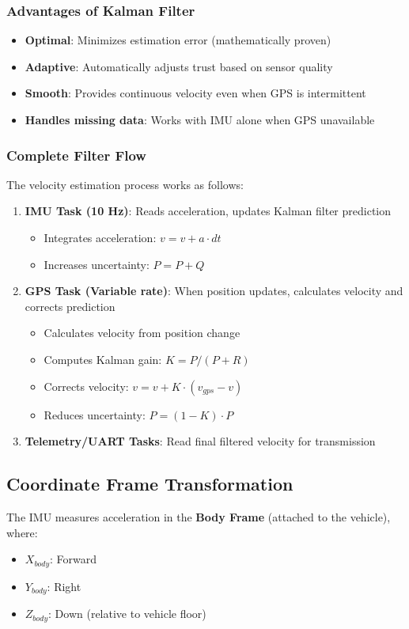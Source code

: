 \documentclass[11pt,a4paper]{article}
\begin{document}
\subsubsection{Advantages of Kalman Filter}
\begin{itemize}
    \item \textbf{Optimal}: Minimizes estimation error (mathematically proven)
    \item \textbf{Adaptive}: Automatically adjusts trust based on sensor quality
    \item \textbf{Smooth}: Provides continuous velocity even when GPS is intermittent
    \item \textbf{Handles missing data}: Works with IMU alone when GPS unavailable
\end{itemize}

\subsubsection{Complete Filter Flow}
The velocity estimation process works as follows:

\begin{enumerate}
    \item \textbf{IMU Task (10 Hz)}: Reads acceleration, updates Kalman filter prediction
    \begin{itemize}
        \item Integrates acceleration: $v = v + a \cdot dt$
        \item Increases uncertainty: $P = P + Q$
    \end{itemize}
    \item \textbf{GPS Task (Variable rate)}: When position updates, calculates velocity and corrects prediction
    \begin{itemize}
        \item Calculates velocity from position change
        \item Computes Kalman gain: $K = P / (P + R)$
        \item Corrects velocity: $v = v + K \cdot (v_{gps} - v)$
        \item Reduces uncertainty: $P = (1 - K) \cdot P$
    \end{itemize}
    \item \textbf{Telemetry/UART Tasks}: Read final filtered velocity for transmission
\end{enumerate}

\subsection{Coordinate Frame Transformation}
The IMU measures acceleration in the \textbf{Body Frame} (attached to the vehicle), where:
\begin{itemize}
    \item $X_{body}$: Forward
    \item $Y_{body}$: Right
    \item $Z_{body}$: Down (relative to vehicle floor)
\end{itemize}
\end{document}
